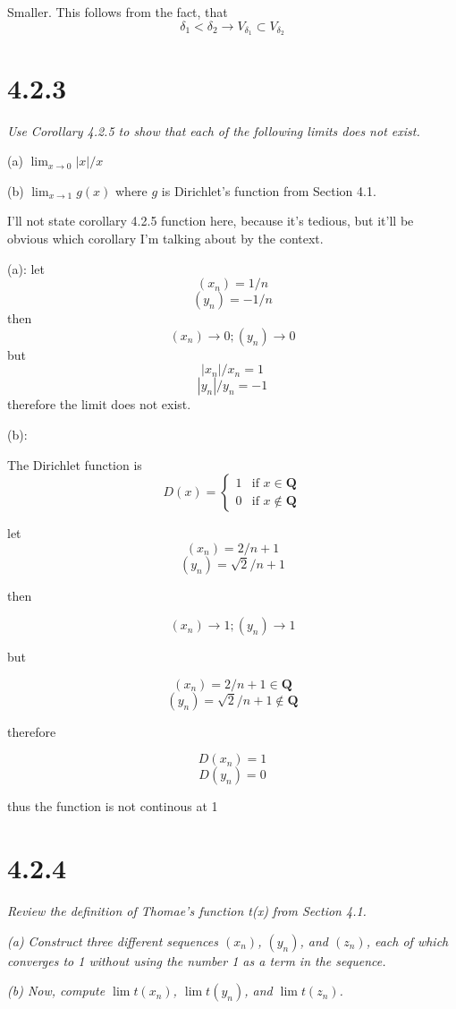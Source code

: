 \documentclass[11pt,oneside,titlepage]{book}
\begin{document}
Smaller. This follows from the fact, that
$$\delta_1 < \delta_2 \to V_{\delta_1} \subset V_{\delta_2}$$

\section*{4.2.3}
\textit{Use Corollary 4.2.5 to show that each of the following limits does not exist.}

(a) $\lim_{x\to0} |x|/x$

(b) $\lim_{x\to 1} g(x)$ where $g$ is Dirichlet’s function from Section 4.1.

I'll not state corollary 4.2.5  function here, because it's tedious, but it'll be obvious which corollary I'm talking about by the context.


(a): let
$$(x_n) = 1/n$$
$$(y_n) = -1/n$$
then
$$(x_n) \to 0;(y_n) \to 0$$
but
$$|x_n| / x_n = 1$$
$$|y_n| / y_n = -1$$
therefore the limit does not exist.

(b):

The Dirichlet function is
\begin{equation}
D(x)=
    \begin{cases}
        1 & \text{if } x \in \textbf{Q}\\
        0 & \text{if } x \notin \textbf{Q}
    \end{cases}
\end{equation}

let
$$(x_n) = 2/n + 1$$
$$(y_n) = \sqrt{2}/n + 1$$

then

$$(x_n) \to 1;(y_n) \to 1$$

but

$$(x_n) = 2/n + 1 \in \textbf{Q}$$
$$(y_n) = \sqrt{2}/n + 1 \notin \textbf{Q}$$

therefore

$$ D(x_n) = 1$$
$$ D(y_n) = 0$$

thus the function is not continous at 1

\section*{4.2.4}
\textit{Review the definition of Thomae’s function t(x) from Section 4.1.}

\textit{(a) Construct three different sequences $(x_n)$, $(y_n)$, and $(z_n)$, each of which converges to 1 without using the number 1 as a term in the sequence.}

\textit{(b) Now, compute $\lim t(x_n)$, $\lim t(y_n)$, and $\lim t(z_n)$.}
\end{document}
